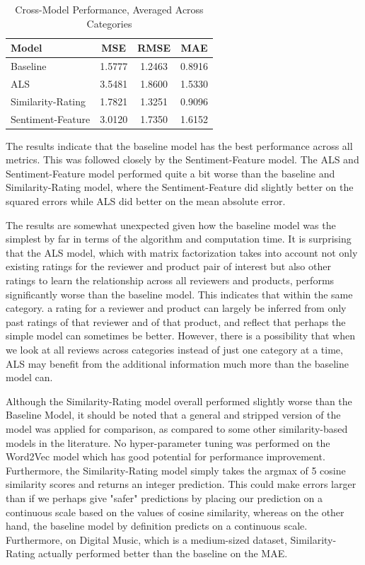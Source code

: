 \documentclass[sigconf,authorversion,nonacm]{acmart}
\begin{document}
    \begin{table}
        \caption{Cross-Model Performance, Averaged Across Categories}
        \label{tab:results1}
        \begin{tabular}{lccc}
        \toprule
        \textbf{Model} & \textbf{MSE} & \textbf{RMSE} & \textbf{MAE} \\
        \midrule
        Baseline & 1.5777 & 1.2463 & 0.8916 \\
        ALS & 3.5481 & 1.8600 & 1.5330 \\
        Similarity-Rating & 1.7821 & 1.3251 & 0.9096 \\
        Sentiment-Feature & 3.0120 & 1.7350 & 1.6152 \\ \bottomrule
        \end{tabular}
    \end{table}

The results indicate that the baseline model has the best performance across all metrics. This was followed closely by the Sentiment-Feature model. The ALS and Sentiment-Feature model performed quite a bit worse than the baseline and Similarity-Rating model, where the Sentiment-Feature did slightly better on the squared errors while ALS did better on the mean absolute error.

The results are somewhat unexpected given how the baseline model was the simplest by far in terms of the algorithm and computation time. It is surprising that the ALS model, which with matrix factorization takes into account not only existing ratings for the reviewer and product pair of interest but also other ratings to learn the relationship across all reviewers and products, performs significantly worse than the baseline model. This indicates that within the same category. a rating for a reviewer and product can largely be inferred from only past ratings of that reviewer and of that product, and reflect that perhaps the simple model can sometimes be better. However, there is a possibility that when we look at all reviews across categories instead of just one category at a time, ALS may benefit from the additional information much more than the baseline model can.

Although the Similarity-Rating model overall performed slightly worse than the Baseline Model, it should be noted that a general and stripped version of the model was applied for comparison, as compared to some other similarity-based models in the literature. No hyper-parameter tuning was performed on the Word2Vec model which has good potential for performance improvement. Furthermore, the Similarity-Rating model simply takes the argmax of 5 cosine similarity scores and returns an integer prediction. This could make errors larger than if we perhaps give "safer" predictions by placing our prediction on a continuous scale based on the values of cosine similarity, whereas on the other hand, the baseline model by definition predicts on a continuous scale. Furthermore, on Digital Music, which is a medium-sized dataset, Similarity-Rating actually performed better than the baseline on the MAE.
\end{document}
